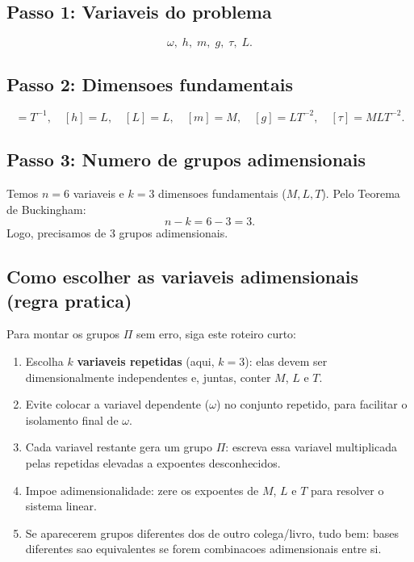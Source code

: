 \documentclass[12pt,a4paper]{article}
\begin{document}
\subsection*{Passo 1: Variaveis do problema}
\begin{equation}
\omega,\; h,\; m,\; g,\; \tau,\; L.
\end{equation}

\subsection*{Passo 2: Dimensoes fundamentais}
\begin{equation}
[\omega]=T^{-1}, \quad [h]=L, \quad [L]=L, \quad [m]=M, \quad [g]=LT^{-2}, \quad [\tau]=MLT^{-2}.
\end{equation}

\subsection*{Passo 3: Numero de grupos adimensionais}
Temos $n=6$ variaveis e $k=3$ dimensoes fundamentais ($M,L,T$). Pelo Teorema de Buckingham:
\begin{equation}
n-k=6-3=3.
\end{equation}
Logo, precisamos de 3 grupos adimensionais.

\subsection*{Como escolher as variaveis adimensionais (regra pratica)}
Para montar os grupos $\Pi$ sem erro, siga este roteiro curto:
\begin{enumerate}
  \item Escolha $k$ \textbf{variaveis repetidas} (aqui, $k=3$): elas devem ser dimensionalmente independentes e, juntas, conter $M$, $L$ e $T$.
  \item Evite colocar a variavel dependente ($\omega$) no conjunto repetido, para facilitar o isolamento final de $\omega$.
  \item Cada variavel restante gera um grupo $\Pi$: escreva essa variavel multiplicada pelas repetidas elevadas a expoentes desconhecidos.
  \item Impoe adimensionalidade: zere os expoentes de $M$, $L$ e $T$ para resolver o sistema linear.
  \item Se aparecerem grupos diferentes dos de outro colega/livro, tudo bem: bases diferentes sao equivalentes se forem combinacoes adimensionais entre si.
\end{enumerate}
\end{document}
